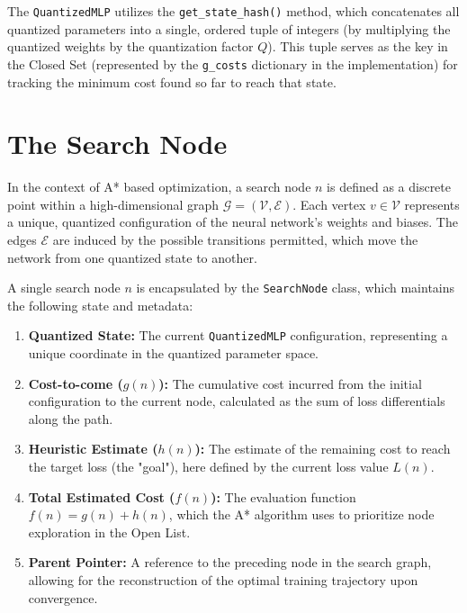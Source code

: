 The \texttt{QuantizedMLP} utilizes the \texttt{get\_state\_hash()} method, which concatenates all quantized parameters into a single, ordered tuple of integers (by multiplying the quantized weights by the quantization factor $Q$). This tuple serves as the key in the Closed Set (represented by the \texttt{g\_costs} dictionary in the implementation) for tracking the minimum cost found so far to reach that state.


\section{The Search Node}

In the context of A* based optimization, a search node $n$ is defined as a discrete point within a high-dimensional graph $\mathcal{G} = (\mathcal{V}, \mathcal{E})$. Each vertex $v \in \mathcal{V}$ represents a unique, quantized configuration of the neural network's weights and biases. The edges $\mathcal{E}$ are induced by the possible transitions permitted, which move the network from one quantized state to another.

A single search node $n$ is encapsulated by the \texttt{SearchNode} class, which maintains the following state and metadata:

\begin{enumerate}
    \item \textbf{Quantized State:} The current \texttt{QuantizedMLP} configuration, representing a unique coordinate in the quantized parameter space.
    \item \textbf{Cost-to-come ($g(n)$):} The cumulative cost incurred from the initial configuration to the current node, calculated as the sum of loss differentials along the path.
    \item \textbf{Heuristic Estimate ($h(n)$):} The estimate of the remaining cost to reach the target loss (the "goal"), here defined by the current loss value $L(n)$.
    \item \textbf{Total Estimated Cost ($f(n)$):} The evaluation function $f(n) = g(n) + h(n)$, which the A* algorithm uses to prioritize node exploration in the Open List.
    \item \textbf{Parent Pointer:} A reference to the preceding node in the search graph, allowing for the reconstruction of the optimal training trajectory upon convergence.
\end{enumerate}

